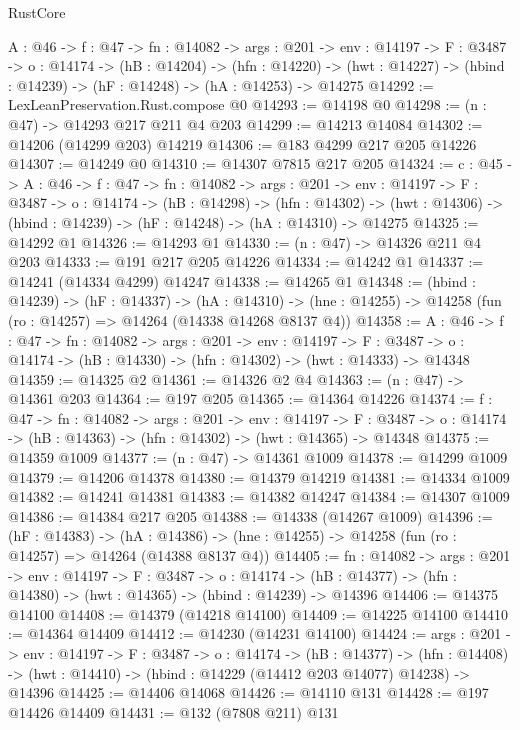 \begin{lexlean}{RustCore}
\begin{coremodule}
  {A : @46} ->
  {f : @47} ->
  {fn : @14082} ->
  {args : @201} ->
  {env : @14197} ->
  {F : @3487} ->
  {o : @14174} ->
  (hB : @14204) ->
  (hfn : @14220) -> (hwt : @14227) -> (hbind : @14239) -> (hF : @14248) -> (hA : @14253) -> @14275
@14292 := LexLeanPreservation.Rust.compose @0
@14293 := @14198 @0
@14298 := (n : @47) -> @14293 @217 @211 @4 @203
@14299 := @14213 @14084
@14302 := @14206 (@14299 @203) @14219
@14306 := @183 @4299 @217 @205 @14226
@14307 := @14249 @0
@14310 := @14307 @7815 @217 @205
@14324 := {c : @45} ->
  {A : @46} ->
  {f : @47} ->
  {fn : @14082} ->
  {args : @201} ->
  {env : @14197} ->
  {F : @3487} ->
  {o : @14174} ->
  (hB : @14298) ->
  (hfn : @14302) -> (hwt : @14306) -> (hbind : @14239) -> (hF : @14248) -> (hA : @14310) -> @14275
@14325 := @14292 @1
@14326 := @14293 @1
@14330 := (n : @47) -> @14326 @211 @4 @203
@14333 := @191 @217 @205 @14226
@14334 := @14242 @1
@14337 := @14241 (@14334 @4299) @14247
@14338 := @14265 @1
@14348 := (hbind : @14239) ->
  (hF : @14337) ->
  (hA : @14310) -> (hne : @14255) -> @14258 (fun (ro : @14257) => @14264 (@14338 @14268 @8137 @4))
@14358 := {A : @46} ->
  {f : @47} ->
  {fn : @14082} ->
  {args : @201} ->
  {env : @14197} ->
  {F : @3487} -> {o : @14174} -> (hB : @14330) -> (hfn : @14302) -> (hwt : @14333) -> @14348
@14359 := @14325 @2
@14361 := @14326 @2 @4
@14363 := (n : @47) -> @14361 @203
@14364 := @197 @205
@14365 := @14364 @14226
@14374 := {f : @47} ->
  {fn : @14082} ->
  {args : @201} ->
  {env : @14197} ->
  {F : @3487} -> {o : @14174} -> (hB : @14363) -> (hfn : @14302) -> (hwt : @14365) -> @14348
@14375 := @14359 @1009
@14377 := (n : @47) -> @14361 @1009
@14378 := @14299 @1009
@14379 := @14206 @14378
@14380 := @14379 @14219
@14381 := @14334 @1009
@14382 := @14241 @14381
@14383 := @14382 @14247
@14384 := @14307 @1009
@14386 := @14384 @217 @205
@14388 := @14338 (@14267 @1009)
@14396 := (hF : @14383) ->
  (hA : @14386) -> (hne : @14255) -> @14258 (fun (ro : @14257) => @14264 (@14388 @8137 @4))
@14405 := {fn : @14082} ->
  {args : @201} ->
  {env : @14197} ->
  {F : @3487} ->
  {o : @14174} -> (hB : @14377) -> (hfn : @14380) -> (hwt : @14365) -> (hbind : @14239) -> @14396
@14406 := @14375 @14100
@14408 := @14379 (@14218 @14100)
@14409 := @14225 @14100
@14410 := @14364 @14409
@14412 := @14230 (@14231 @14100)
@14424 := {args : @201} ->
  {env : @14197} ->
  {F : @3487} ->
  {o : @14174} ->
  (hB : @14377) ->
  (hfn : @14408) -> (hwt : @14410) -> (hbind : @14229 (@14412 @203 @14077) @14238) -> @14396
@14425 := @14406 @14068
@14426 := @14110 @131
@14428 := @197 @14426 @14409
@14431 := @132 (@7808 @211) @131

\end{coremodule}
\end{lexlean}
